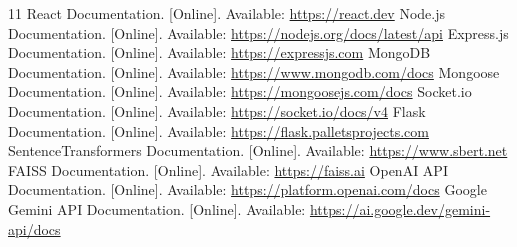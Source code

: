 \documentclass[conference]{IEEEtran}
\begin{document}
\begin{thebibliography}{11}
 React Documentation. [Online]. Available: \url{https://react.dev}
 Node.js Documentation. [Online]. Available: \url{https://nodejs.org/docs/latest/api}
 Express.js Documentation. [Online]. Available: \url{https://expressjs.com}
 MongoDB Documentation. [Online]. Available: \url{https://www.mongodb.com/docs}
 Mongoose Documentation. [Online]. Available: \url{https://mongoosejs.com/docs}
 Socket.io Documentation. [Online]. Available: \url{https://socket.io/docs/v4}
 Flask Documentation. [Online]. Available: \url{https://flask.palletsprojects.com}
 SentenceTransformers Documentation. [Online]. Available: \url{https://www.sbert.net}
 FAISS Documentation. [Online]. Available: \url{https://faiss.ai}
 OpenAI API Documentation. [Online]. Available: \url{https://platform.openai.com/docs}
 Google Gemini API Documentation. [Online]. Available: \url{https://ai.google.dev/gemini-api/docs}
\end{thebibliography}
\end{document}
